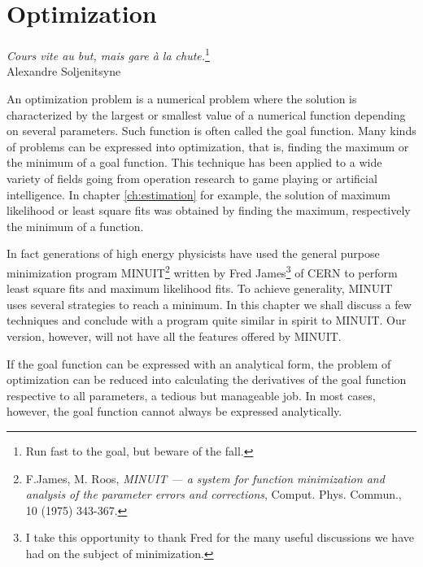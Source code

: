\documentclass[twoside]{book}
\begin{document}
\fi

\chapter{Optimization}
\label{ch:minimization} \vspace{1 ex}
\begin{flushright}
{\sl Cours vite au but, mais gare \`a la chute.}\footnote{Run fast
to the goal, but beware of the fall.}\\ Alexandre Soljenitsyne
\end{flushright}
\vspace{1 ex} An optimization problem is a numerical problem where
the solution is characterized by the largest or smallest value of
a numerical function depending on several parameters. Such
function is often called the goal function. Many kinds of problems
can be expressed into optimization, that is, finding the maximum
or the minimum of a goal function. This technique has been applied
to a wide variety of fields going from operation research to game
playing or artificial intelligence. In chapter \ref{ch:estimation}
for example, the solution of maximum likelihood or least square
fits was obtained by finding the maximum, respectively the minimum
of a function.

In fact generations of high energy physicists have used the
general purpose minimization program MINUIT\footnote{F.James, M.
Roos, {\sl MINUIT --- a system for function minimization and
analysis of the parameter errors and corrections}, Comput. Phys.
Commun., 10 (1975) 343-367.} written by Fred James\footnote{I take
this opportunity to thank Fred for the many useful discussions we
have had on the subject of minimization.} of CERN to perform least
square fits and maximum likelihood fits.  To achieve generality,
MINUIT uses several strategies to reach a minimum. In this chapter
we shall discuss a few techniques and conclude with a program
quite similar in spirit to MINUIT. Our version, however, will not
have all the features offered by MINUIT.

If the goal function can be expressed with an analytical form, the
problem of optimization can be reduced into calculating the
derivatives of the goal function respective to all parameters, a
tedious but manageable job. In most cases, however, the goal
function cannot always be expressed analytically.
\end{document}
